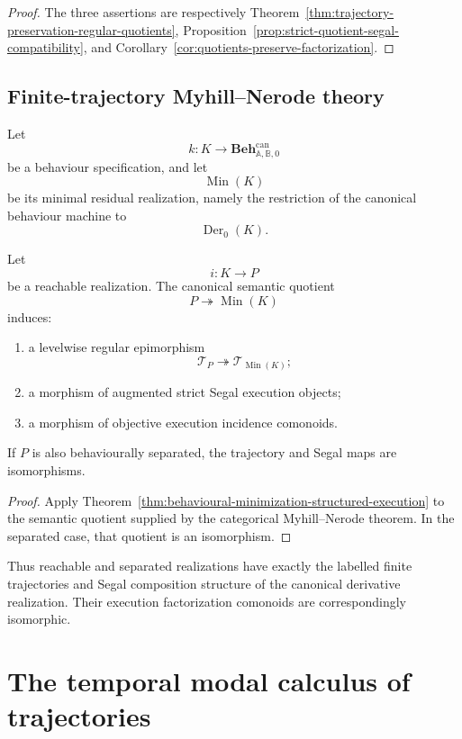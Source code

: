 \begin{proof}
The three assertions are respectively
Theorem~\ref{thm:trajectory-preservation-regular-quotients},
Proposition~\ref{prop:strict-quotient-segal-compatibility}, and
Corollary~\ref{cor:quotients-preserve-factorization}.
\end{proof}

\subsection{Finite-trajectory Myhill--Nerode theory}
\label{subsec:finite-trajectory-myhill-nerode}

Let
\[
    k:K\to
    \mathbf{Beh}_{\mathbb A,\mathbb B,0}^{\mathrm{can}}
\]
be a behaviour specification, and let
\[
    \operatorname{Min}(K)
\]
be its minimal residual realization, namely the restriction of the canonical
behaviour machine to
\[
    \operatorname{Der}_0(K).
\]

\begin{corollary}
\label{cor:finite-trajectory-myhill-nerode}
Let
\[
    i:K\to P
\]
be a reachable realization. The canonical semantic quotient
\[
    P\twoheadrightarrow\operatorname{Min}(K)
\]
induces:
\begin{enumerate}
    \item a levelwise regular epimorphism
    \[
        \mathscr T_P
        \twoheadrightarrow
        \mathscr T_{\operatorname{Min}(K)};
    \]
    \item a morphism of augmented strict Segal execution objects;
    \item a morphism of objective execution incidence comonoids.
\end{enumerate}
If \(P\) is also behaviourally separated, the trajectory and Segal maps are
isomorphisms.
\end{corollary}

\begin{proof}
Apply
Theorem~\ref{thm:behavioural-minimization-structured-execution}
to the semantic quotient supplied by the categorical Myhill--Nerode theorem.
In the separated case, that quotient is an isomorphism.
\end{proof}

Thus reachable and separated realizations have exactly the labelled finite
trajectories and Segal composition structure of the canonical derivative
realization. Their execution factorization comonoids are correspondingly
isomorphic.

\section{The temporal modal calculus of trajectories}
\label{sec:temporal-modal-calculus}


